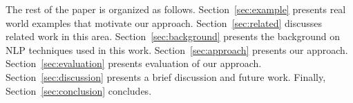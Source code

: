 The rest of the paper is organized as follows.
Section~\ref{sec:example} presents real world examples that motivate our approach.
Section~\ref{sec:related} discusses related work in this area.
Section~\ref{sec:background} presents the  background on NLP techniques used in this work.
Section~\ref{sec:approach} presents our approach.
Section~\ref{sec:evaluation} presents evaluation of our approach.
Section~\ref{sec:discussion} presents a brief discussion and future work.
Finally, Section~\ref{sec:conclusion} concludes.


